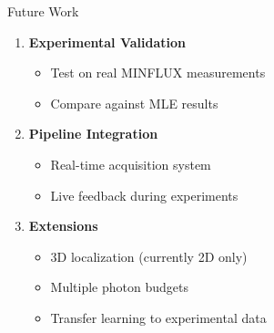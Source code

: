 \documentclass[aspectratio=169]{beamer}
\begin{document}
\begin{frame}{Future Work}
    
    \begin{enumerate}
        \item \textbf{Experimental Validation}
        \begin{itemize}
            \item Test on real MINFLUX measurements
            \item Compare against MLE results
        \end{itemize}
        
        \vspace{0.3cm}
        
        \item \textbf{Pipeline Integration}
        \begin{itemize}
            \item Real-time acquisition system
            \item Live feedback during experiments
        \end{itemize}
        
        \vspace{0.3cm}
        
        \item \textbf{Extensions}
        \begin{itemize}
            \item 3D localization (currently 2D only)
            \item Multiple photon budgets
            \item Transfer learning to experimental data
        \end{itemize}
    \end{enumerate}
    
\end{frame}
\end{document}
